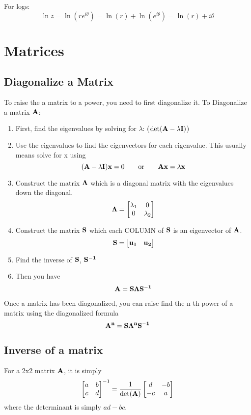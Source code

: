 \documentclass{article}
\begin{document}
For logs:
$$
\ln z = \ln(re^{i\theta}) = \ln(r) +  \ln(e^{i\theta}) = \ln(r) + i\theta
$$

\section{Matrices}
\subsection{Diagonalize a Matrix}
To raise the a matrix to a power, you need to first diagonalize it. To Diagonalize a matrix $\vb{A}$:

\begin{enumerate}
	\item First, find the eigenvalues by solving for $\lambda$: ($\det(\vb{A}-\lambda \vb{I})$)
	\item Use the eigenvalues to find the eigenvectors for each eigenvalue.  This usually means solve for x using
	      $$
	      (\vb{A} - \lambda \vb{I})\vb{x} = 0 \qquad \text{or} \qquad \vb{A}\vb{x} = \lambda \vb{x}
	      $$
	\item Construct the matrix $\vb{\Lambda}$ which is a diagonal matrix with the eigenvalues down the diagonal.
	      $$
	      \vb{\Lambda} = 
	      \begin{bmatrix}
	      	\lambda_1 & 0         \\
	      	0         & \lambda_2 
	      \end{bmatrix}
	      $$
	\item Construct the matrix $\vb{S}$ which each COLUMN of $\vb{S}$ is an eigenvector of $\vb{A}$.
	      $$
	      \vb{S} = 
	      \begin{bmatrix}
	      	\vb{u_1} &   
	      	\vb{u_2}
	      \end{bmatrix}
	      $$
	\item Find the inverse of $\vb{S}$, $\vb{S^{-1}}$
	\item Then you have
	      $$
	      \vb{A} = \vb{S}\vb{\Lambda}{\vb{S^{-1}}}
	      $$
\end{enumerate}

Once a matrix has been diagonalized, you can raise find the n-th power of a matrix using the diagonalized formula
$$
\vb{A^n} = \vb{S}\vb{\Lambda^n}{\vb{S^{-1}}}
$$

\subsection{Inverse of a matrix}
For a 2x2 matrix $\vb{A}$, it is simply
$$
\begin{bmatrix}
	a & b \\
	c & d 
\end{bmatrix}^{-1}
= 
\frac{1}{\det(\vb{A})}
\begin{bmatrix}
	d  & -b \\
	-c & a  
\end{bmatrix}
$$
where the determinant is simply $ad-bc$. 
\end{document}
